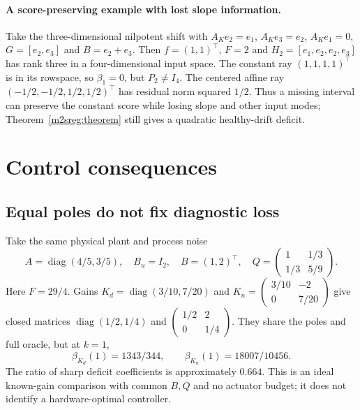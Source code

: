 \documentclass[11pt]{article}
\begin{document}
\paragraph{A score-preserving example with lost slope information.}
Take the three-dimensional nilpotent shift with
$A_K e_2=e_1$, $A_K e_3=e_2$, $A_K e_1=0$,
$G=[e_2,e_3]$ and $B=e_2+e_3$. Then $f=(1,1)^\top$, $F=2$ and
$H_2=[e_1,e_2,e_2,e_3]$ has rank three in a four-dimensional input space.
The constant ray $(1,1,1,1)^\top$ is in its rowspace, so $\beta_1=0$,
but $P_2\ne I_4$. The centered affine ray
$(-1/2,-1/2,1/2,1/2)^\top$ has residual norm squared $1/2$.
Thus a missing interval can preserve the constant score while losing slope
and other input modes; Theorem~\ref{m2sreg:theorem} still gives a quadratic
healthy-drift deficit.

\section{Control consequences}
\subsection{Equal poles do not fix diagnostic loss}
Take the same physical plant and process noise
\[
A=\operatorname{diag}(4/5,3/5),\quad B_u=I_2,\quad B=(1,2)^\top,
\quad Q=\begin{pmatrix}1&1/3\\1/3&5/9\end{pmatrix}.
\]
Here $F=29/4$. Gains
$K_d=\operatorname{diag}(3/10,7/20)$ and
$K_n=\left(\begin{smallmatrix}3/10&-2\\0&7/20\end{smallmatrix}\right)$
give closed matrices $\operatorname{diag}(1/2,1/4)$ and
$\left(\begin{smallmatrix}1/2&2\\0&1/4\end{smallmatrix}\right)$.
They share the poles and full oracle, but at $k=1$,
\[
\beta_{K_d}(1)=1343/344,\qquad \beta_{K_n}(1)=18007/10456.
\]
The ratio of sharp deficit coefficients is approximately $0.664$.
This is an ideal known-gain comparison with common $B,Q$ and no actuator
budget; it does not identify a hardware-optimal controller.
\end{document}
